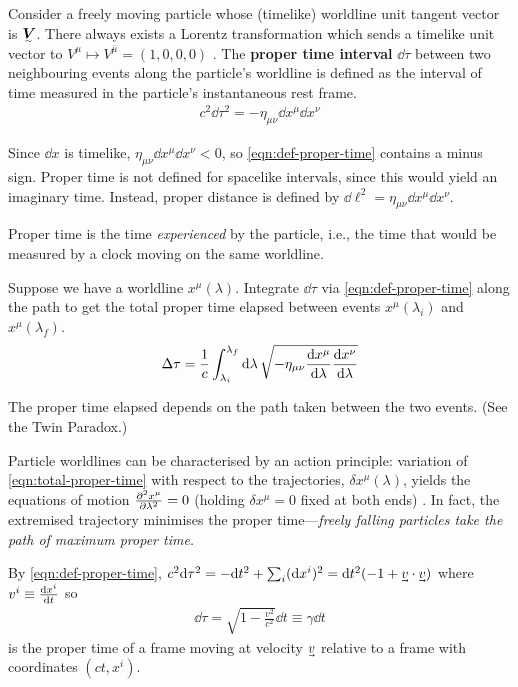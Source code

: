 Consider a freely moving particle whose (timelike) worldline unit tangent vector is $\ts V$.
There always exists a Lorentz transformation which sends a timelike unit vector to $V^\mu \mapsto V^{\bar\mu} = (1, 0, 0, 0)$ \exercise.
The \textbf{proper time interval} $\dd\tau$ between two neighbouring events along the particle's worldline is defined as the interval of time measured in the particle's instantaneous rest frame.
\begin{align}
	c^2\dd\tau^2 = -\eta_{\mu\nu}\dd x^\mu\dd x^\nu
	\label{eqn:def-proper-time}
\end{align}

\begin{note}
	Since $\dd x$ is timelike, $\eta_{\mu\nu}\dd x^\mu\dd x^\nu < 0$, so \eqref{eqn:def-proper-time} contains a minus sign.
	Proper time is not defined for spacelike intervals, since this would yield an imaginary time.
	Instead, proper distance is defined by $\dd\ell^2 = \eta_{\mu\nu}\dd x^\mu\dd x^\nu$.
\end{note}
Proper time is the time \emph{experienced} by the particle, i.e., the time that would be measured by a clock moving on the same worldline.

Suppose we have a worldline $x^\mu(\lambda)$.
Integrate $\dd\tau$ via \eqref{eqn:def-proper-time} along the path to get the total proper time elapsed between events $x^\mu(\lambda_i)$ and $x^\mu(\lambda_f)$.
\begin{align}
	\Delta\tau = \frac1c \int_{\lambda_i}^{\lambda_f} \dd\lambda \, \sqrt{-\eta_{\mu\nu}\dv{x^\mu}{\lambda}\dv{x^\nu}{\lambda}}
	\label{eqn:total-proper-time}
\end{align}
\begin{note}
	The proper time elapsed depends on the path taken between the two events.
	(See the Twin Paradox.)
\end{note}

Particle worldlines can be characterised by an action principle: variation of \eqref{eqn:total-proper-time} with respect to the trajectories, $\delta x^\mu(\lambda)$, yields the equations of motion $\pdv[2]{x^\mu}{\lambda} = 0$ (holding $\delta x^\mu = 0$ fixed at both ends) \exercise.
In fact, the extremised trajectory minimises the proper time---\emph{freely falling particles take the path of maximum proper time.}

By \eqref{eqn:def-proper-time},
\begin{math}
	c^2\dd\tau^2 = -\dd t^2 + \sum_i(\dd x^i)^2 = \dd t^2\qty(-1 + \uvec v\cdot\uvec v)
\end{math}
where $v^i \equiv \dv{x^i}{t}$ so
\begin{align}
	\dd\tau = \sqrt{1 - \frac{v^2}{c^2}}\dd t \equiv \gamma\dd t
\end{align}
is the proper time of a frame moving at velocity $\uvec v$ relative to a frame with coordinates $(ct, x^i)$.